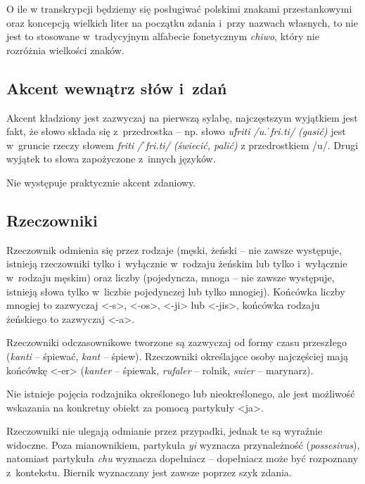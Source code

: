 \begin{spacing}{1.1}
O ile w transkrypcji będziemy się posługiwać polskimi znakami przestankowymi oraz 
koncepcją wielkich liter na początku zdania i~przy nazwach własnych, to nie 
jest to stosowane w~tradycyjnym alfabecie fonetycznym \emph{chiwo}, który nie 
rozróżnia wielkości znaków.

\subsection{Akcent wewnątrz słów i~zdań}

Akcent kładziony jest zazwyczaj na pierwszą sylabę, najczęstszym wyjątkiem jest 
fakt, że słowo składa się z~przedrostka -- np. słowo \emph{uf́riti /u.ˈfri.ti/ 
(gasić)} jest w~gruncie rzeczy słowem \emph{friti /ˈfri.ti/ (świecić, palić)} 
z przedrostkiem /u/. Drugi wyjątek to słowa zapożyczone z~innych języków.

Nie występuje praktycznie akcent zdaniowy.

\subsection{Rzeczowniki}
Rzeczownik odmienia się przez rodzaje (męski, żeński -- nie zawsze występuje, 
istnieją rzeczowniki tylko i~wyłącznie w~rodzaju żeńskim lub tylko i~wyłącznie 
w~rodzaju męskim) oraz liczby (pojedyncza, mnoga -- nie zawsze występuje, 
istnieją słowa tylko w~liczbie pojedynczej lub tylko mnogiej). Końcówka liczby 
mnogiej to zazwyczaj <-s>, <-os>, <-ji> lub <-jis>, końcówka rodzaju żeńskiego 
to zazwyczaj <-a>.

Rzeczowniki odczasownikowe tworzone są zazwyczaj od formy czasu przeszłego 
(\emph{kanti} -- śpiewać, \emph{kant} -- śpiew). Rzeczowniki określające osoby 
najczęściej mają końcówkę <-er> (\emph{kanter} -- śpiewak, \emph{rufaler} -- 
rolnik, \emph{suier} -- marynarz).

Nie istnieje pojęcia rodzajnika określonego lub nieokreślonego, ale jest 
możliwość wskazania na konkretny obiekt za pomocą partykuły <ja>.


Rzeczowniki nie ulegają odmianie przez przypadki, jednak te są wyraźnie 
widoczne. Poza mianownikiem, partykuła \emph{yi} wyznacza przynależność 
(\emph{possesivus}), natomiast partykuła \emph{chu} wyznacza dopełniacz -- 
dopełniacz może być rozpoznany z~kontekstu. Biernik wyznaczany jest zawsze 
poprzez szyk zdania.



\end{spacing}
